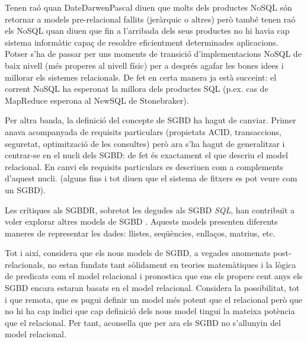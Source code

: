 Tenen raó quan DateDarwenPascal diuen que molts dels productes NoSQL són retornar a models pre-relacional fallits (jeràrquic o  altres) però també tenen raó els NoSQL quan diuen que fin a l'arribada dels seus productes no hi havia cap sistema informàtic capaç de resoldre eficientment determinades aplicacions. Potser s'ha de passar per uns moments de transició d'implementacions NoSQL de baix nivell (més properes al nivell físic) per a després agafar les bones idees i millorar els sistemes relacionals. De fet en certa manera ja està succeint: el corrent NoSQL ha esperonat la millora dels productes SQL (p.ex. cas de MapReduce esperona al NewSQL de Stonebraker).

Per altra banda, la definició del concepte de SGBD ha hagut de canviar. Primer anava acompanyada de requisits particulars (propietats ACID, transaccions, seguretat, optimització de les consultes) però ara s'ha hagut de generalitzar i centrar-se en el nucli dels SGBD: de fet és exactament el que descriu el model relacional. En canvi els requisits particulars es descriuen com a complements d'aquest nucli. (alguns fins i tot diuen que el sistema de fitxers es pot veure com un SGBD).




\todo{}





Les crítiques als SGBDR, sobretot les degudes als SGBD
\emph{SQL}, han contribuït a voler explorar altres models de
SGBD \parencite{stonebraker09}. Aquests models presenten diferents
maneres de representar les dades: llistes, seqüències, enllaços,
matrius, etc.

Tot i així, \textcite[cap.~21--25]{date06} considera que els nous
models de SGBD, a vegades anomenats post-relacionals, no estan fundats
tant sòlidament en teories matemàtiques i la lògica de predicats com
el model relacional i pronostica que ens els propers cent anys els
SGBD encara estaran basats en el model
relacional. %
Considera la possibilitat, tot i que remota, que es pugui definir un
model més potent que el relacional però que no hi ha cap indici que
cap definició dels nous model tingui la mateixa potència que el
relacional. Per tant, aconsella que per ara els SGBD no s'allunyin del
model relacional. %



